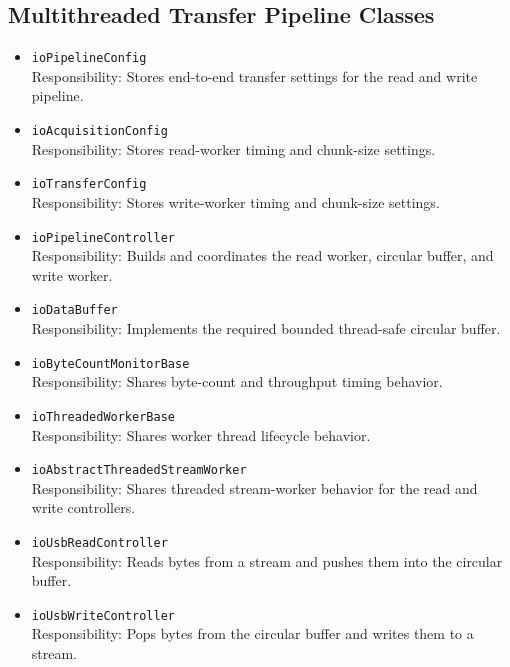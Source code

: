     \subsection{Multithreaded Transfer Pipeline Classes}
    \begin{itemize}
        \item \texttt{ioPipelineConfig} \\
        Responsibility: Stores end-to-end transfer settings for the read and write pipeline.

        \item \texttt{ioAcquisitionConfig} \\
        Responsibility: Stores read-worker timing and chunk-size settings.

        \item \texttt{ioTransferConfig} \\
        Responsibility: Stores write-worker timing and chunk-size settings.

        \item \texttt{ioPipelineController} \\
        Responsibility: Builds and coordinates the read worker, circular buffer, and write worker.

        \item \texttt{ioDataBuffer} \\
        Responsibility: Implements the required bounded thread-safe circular buffer.

        \item \texttt{ioByteCountMonitorBase} \\
        Responsibility: Shares byte-count and throughput timing behavior.

        \item \texttt{ioThreadedWorkerBase} \\
        Responsibility: Shares worker thread lifecycle behavior.

        \item \texttt{ioAbstractThreadedStreamWorker} \\
        Responsibility: Shares threaded stream-worker behavior for the read and write controllers.

        \item \texttt{ioUsbReadController} \\
        Responsibility: Reads bytes from a stream and pushes them into the circular buffer.

        \item \texttt{ioUsbWriteController} \\
        Responsibility: Pops bytes from the circular buffer and writes them to a stream.


\end{itemize}
